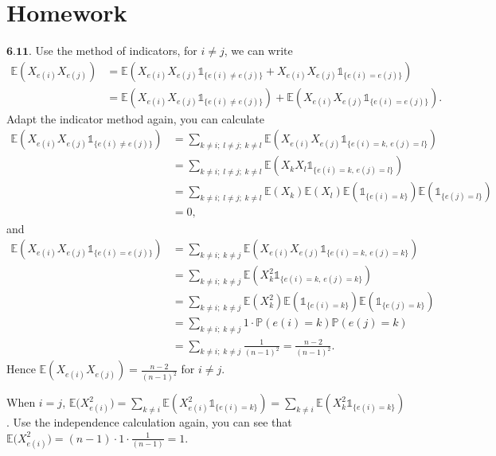 \documentclass[12pt]{article}
\begin{document}
\newpage
\section*{Homework}
$\textbf{6.11.}$ Use the method of indicators, for $i\neq j$, we can write 
\begin{equation*}
\begin{aligned}
\mathbb{E}(X_{e(i)}X_{e(j)}) &= \mathbb{E}(X_{e(i)}X_{e(j)}\mathds{1}_{\{e(i)\neq e(j)\}}+X_{e(i)}X_{e(j)}\mathds{1}_{\{e(i)= e(j)\}}) \\&
=\mathbb{E}(X_{e(i)}X_{e(j)}\mathds{1}_{\{e(i)\neq e(j)\}})+\mathbb{E}(X_{e(i)}X_{e(j)}\mathds{1}_{\{e(i)= e(j)\}}).
\end{aligned}
\end{equation*}
Adapt the indicator method again, you can calculate
\begin{equation*}
\begin{aligned}
\mathbb{E}(X_{e(i)}X_{e(j)}\mathds{1}_{\{e(i)\neq e(j)\}}) &= \sum_{k\neq i;\;l\neq j;\; k\neq l}\mathbb{E}(X_{e(i)}X_{e(j)}\mathds{1}_{\{e(i)=k,\,e(j)=l\}}) \\&
=\sum_{k\neq i;\;l\neq j;\; k\neq l}\mathbb{E}(X_k X_l\mathds{1}_{\{e(i)=k,\,e(j)=l\}}) \\&
=\sum_{k\neq i;\;l\neq j;\; k\neq l}\mathbb{E}(X_k)\mathbb{E}(X_l)\mathbb{E}(\mathds{1}_{\{e(i)=k\}})\mathbb{E}(\mathds{1}_{\{e(j)=l\}}) \\&
=0,
\end{aligned}
\end{equation*}
and
\begin{equation*}
\begin{aligned}
\mathbb{E}(X_{e(i)}X_{e(j)}\mathds{1}_{\{e(i)=e(j)\}}) &= \sum_{k\neq i;\;k\neq j}\mathbb{E}(X_{e(i)}X_{e(j)}\mathds{1}_{\{e(i)=k,\,e(j)=k\}}) \\&
=\sum_{k\neq i;\;k\neq j}\mathbb{E}(X_k^2\mathds{1}_{\{e(i)=k,\,e(j)=k\}}) \\&
=\sum_{k\neq i;\;k\neq j}\mathbb{E}(X_k^2)\mathbb{E}(\mathds{1}_{\{e(i)=k\}})\mathbb{E}(\mathds{1}_{\{e(j)=k\}}) \\&
=\sum_{k\neq i;\;k\neq j}1\cdot\mathbb{P}(e(i)=k)\mathbb{P}(e(j)=k) \\&
=\sum_{k\neq i;\;k\neq j}\frac{1}{(n-1)^2} = \frac{n-2}{(n-1)^2}.
\end{aligned}
\end{equation*}
Hence $\mathbb{E}(X_{e(i)}X_{e(j)})=\frac{n-2}{(n-1)^2}$ for $i\neq j$.

When $i=j$, $\mathbb{E}\big(X_{e(i)}^2\big)=\sum_{k\neq i}\mathbb{E}(X_{e(i)}^2\mathds{1}_{\{e(i)=k\}})=\sum_{k\neq i}\mathbb{E}(X_k^2\mathds{1}_{\{e(i)=k\}})$. Use the independence calculation again, you can see that $\mathbb{E}\big(X_{e(i)}^2\big)=(n-1)\cdot1\cdot\frac{1}{(n-1)}=1$.
\end{document}
